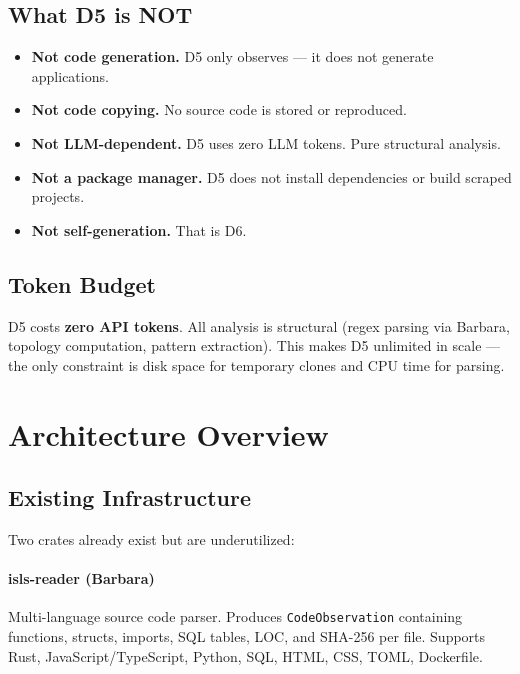\documentclass[11pt,a4paper]{article}
\begin{document}
\subsection{What D5 is NOT}

\begin{itemize}[nosep]
\item \textbf{Not code generation.} D5 only observes --- it does not
      generate applications.
\item \textbf{Not code copying.} No source code is stored or reproduced.
\item \textbf{Not LLM-dependent.} D5 uses zero LLM tokens. Pure structural
      analysis.
\item \textbf{Not a package manager.} D5 does not install dependencies or
      build scraped projects.
\item \textbf{Not self-generation.} That is D6.
\end{itemize}

\subsection{Token Budget}

D5 costs \textbf{zero API tokens}. All analysis is structural (regex
parsing via Barbara, topology computation, pattern extraction). This
makes D5 unlimited in scale --- the only constraint is disk space for
temporary clones and CPU time for parsing.


\section{Architecture Overview}

\subsection{Existing Infrastructure}

Two crates already exist but are underutilized:

\paragraph{isls-reader (Barbara)} Multi-language source code parser.
Produces \texttt{CodeObservation} containing functions, structs, imports,
SQL tables, LOC, and SHA-256 per file. Supports Rust, JavaScript/TypeScript,
Python, SQL, HTML, CSS, TOML, Dockerfile.
\end{document}
